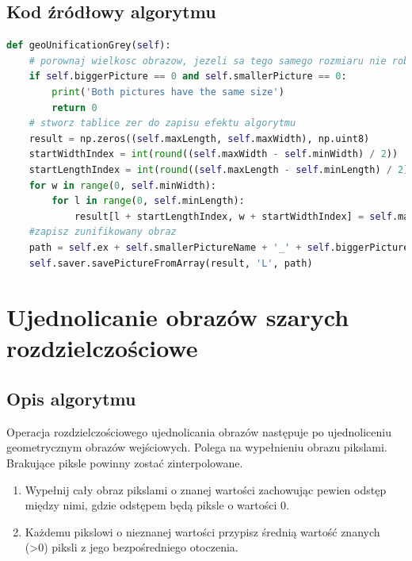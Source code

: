 \documentclass[a4paper,12pt, titlepage]{report}
\begin{document}
\subsection*{Kod źródłowy algorytmu}
\begin{lstlisting}[language=Python]
def geoUnificationGrey(self):
	# porownaj wielkosc obrazow, jezeli sa tego samego rozmiaru nie rob nic
	if self.biggerPicture == 0 and self.smallerPicture == 0:
		print('Both pictures have the same size')
		return 0
	# stworz tablice zer do zapisu efektu algorytmu
	result = np.zeros((self.maxLength, self.maxWidth), np.uint8)
	startWidthIndex = int(round((self.maxWidth - self.minWidth) / 2))
	startLengthIndex = int(round((self.maxLength - self.minLength) / 2))
	for w in range(0, self.minWidth):
		for l in range(0, self.minLength):
			result[l + startLengthIndex, w + startWidthIndex] = self.matrix[l, w]
	#zapisz zunifikowany obraz
	path = self.ex + self.smallerPictureName + '_' + self.biggerPictureName + '.png'
	self.saver.savePictureFromArray(result, 'L', path)
\end{lstlisting}

\section{Ujednolicanie obrazów szarych rozdzielczościowe}
\subsection*{Opis algorytmu}
\par Operacja rozdzielczościowego ujednolicania obrazów następuje po ujednoliceniu geometrycznym obrazów wejściowych. Polega na wypełnieniu obrazu pikslami. Brakujące piksle powinny zostać zinterpolowane.
\begin{enumerate}
\item Wypełnij cały obraz pikslami o znanej wartości zachowując pewien odstęp między nimi, gdzie odstępem będą piksle o wartości 0.
\item Każdemu pikslowi o nieznanej wartości przypisz średnią wartość znanych (>0) piksli z jego bezpośredniego otoczenia.
\end{enumerate}
\end{document}
